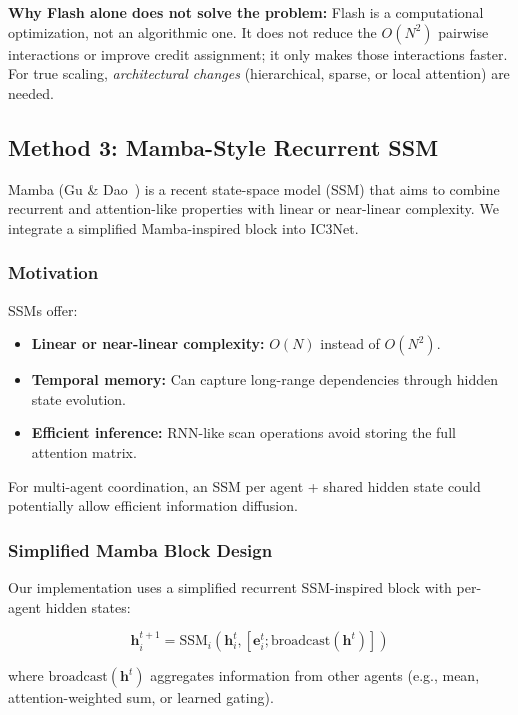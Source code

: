 \textbf{Why Flash alone does not solve the problem:} Flash is a computational optimization, not an algorithmic one. It does not reduce the $O(N^2)$ pairwise interactions or improve credit assignment; it only makes those interactions faster. For true scaling, \emph{architectural changes} (hierarchical, sparse, or local attention) are needed.


\subsection{Method 3: Mamba-Style Recurrent SSM}
\label{subsec:mamba}

Mamba (Gu \& Dao~\cite{mamba}) is a recent state-space model (SSM) that aims to combine recurrent and attention-like properties with linear or near-linear complexity. We integrate a simplified Mamba-inspired block into IC3Net.

\subsubsection{Motivation}

SSMs offer:
\begin{itemize}
    \item \textbf{Linear or near-linear complexity:} $O(N)$ instead of $O(N^2)$.
    \item \textbf{Temporal memory:} Can capture long-range dependencies through hidden state evolution.
    \item \textbf{Efficient inference:} RNN-like scan operations avoid storing the full attention matrix.
\end{itemize}

For multi-agent coordination, an SSM per agent + shared hidden state could potentially allow efficient information diffusion.

\subsubsection{Simplified Mamba Block Design}

Our implementation uses a simplified recurrent SSM-inspired block with per-agent hidden states:

\begin{equation}
\mathbf{h}_i^{t+1} = \text{SSM}_i(\mathbf{h}_i^t, [\mathbf{e}_i^t; \text{broadcast}(\mathbf{h}^t)])
\end{equation}

where $\text{broadcast}(\mathbf{h}^t)$ aggregates information from other agents (e.g., mean, attention-weighted sum, or learned gating).

